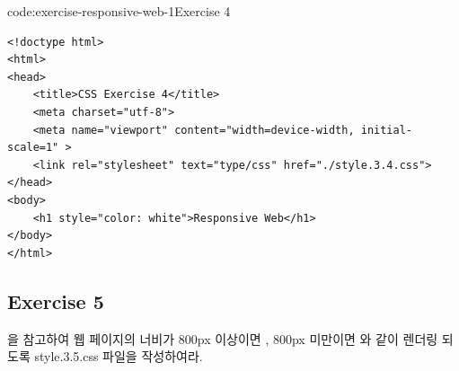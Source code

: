 \begin{codeenv}{code:exercise-responsive-web-1}{Exercise 4}\begin{verbatim}
<!doctype html>
<html>
<head>
    <title>CSS Exercise 4</title>
    <meta charset="utf-8">
    <meta name="viewport" content="width=device-width, initial-scale=1" >
    <link rel="stylesheet" text="type/css" href="./style.3.4.css">
</head>
<body>
    <h1 style="color: white">Responsive Web</h1>
</body>
</html>
\end{verbatim}
\end{codeenv}

\subsection*{Exercise 5}
을 참고하여 웹 페이지의 너비가 800px 이상이면 , 800px 미만이면 와 같이 렌더링 되도록 style.3.5.css 파일을 작성하여라.

